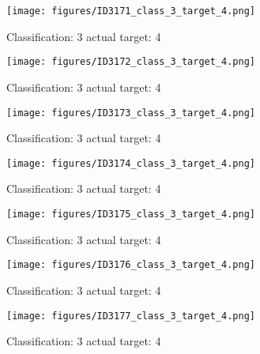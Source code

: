 \begin{figure}[h!]
\begin{center}
\texttt{[image: figures/ID3171\_class\_3\_target\_4.png]}
\end{center}
\caption{ Classification: 3 actual target: 4}
\label{fig:ID3171_class_3_target_4}
\end{figure}
\begin{figure}[h!]
\begin{center}
\texttt{[image: figures/ID3172\_class\_3\_target\_4.png]}
\end{center}
\caption{ Classification: 3 actual target: 4}
\label{fig:ID3172_class_3_target_4}
\end{figure}
\begin{figure}[h!]
\begin{center}
\texttt{[image: figures/ID3173\_class\_3\_target\_4.png]}
\end{center}
\caption{ Classification: 3 actual target: 4}
\label{fig:ID3173_class_3_target_4}
\end{figure}
\begin{figure}[h!]
\begin{center}
\texttt{[image: figures/ID3174\_class\_3\_target\_4.png]}
\end{center}
\caption{ Classification: 3 actual target: 4}
\label{fig:ID3174_class_3_target_4}
\end{figure}
\begin{figure}[h!]
\begin{center}
\texttt{[image: figures/ID3175\_class\_3\_target\_4.png]}
\end{center}
\caption{ Classification: 3 actual target: 4}
\label{fig:ID3175_class_3_target_4}
\end{figure}
\begin{figure}[h!]
\begin{center}
\texttt{[image: figures/ID3176\_class\_3\_target\_4.png]}
\end{center}
\caption{ Classification: 3 actual target: 4}
\label{fig:ID3176_class_3_target_4}
\end{figure}
\begin{figure}[h!]
\begin{center}
\texttt{[image: figures/ID3177\_class\_3\_target\_4.png]}
\end{center}
\caption{ Classification: 3 actual target: 4}
\label{fig:ID3177_class_3_target_4}
\end{figure}
